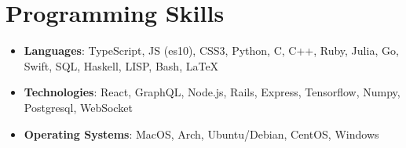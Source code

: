 \documentclass[letterpaper,8pt]{article}
\newcommand{\resumeSubHeadingListStart}{\begin{itemize}[leftmargin=*]}
\newcommand{\resumeSubHeadingListEnd}{\end{itemize}}
\begin{document}
\section{Programming Skills}
  \resumeSubHeadingListStart
    \item{
      \textbf{Languages}{: TypeScript, JS (es10), CSS3, Python, C, C++, Ruby, Julia, Go, Swift, SQL, Haskell, LISP, Bash, LaTeX}
    }
    \item{
      \textbf{Technologies}{: React, GraphQL, Node.js, Rails, Express, Tensorflow, Numpy, Postgresql, WebSocket}
    }
    \item{
      \textbf{Operating Systems}{: MacOS, Arch, Ubuntu/Debian, CentOS, Windows}
    }
  \resumeSubHeadingListEnd


\end{document}
